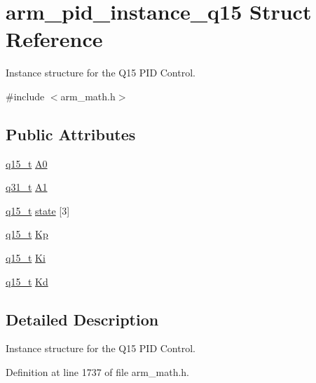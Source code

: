 \hypertarget{structarm__pid__instance__q15}{}\section{arm\+\_\+pid\+\_\+instance\+\_\+q15 Struct Reference}
\label{structarm__pid__instance__q15}


Instance structure for the Q15 P\+ID Control.  




{\ttfamily \#include $<$arm\+\_\+math.\+h$>$}

\subsection*{Public Attributes}
\begin{DoxyCompactItemize}
\item 
\hyperlink{arm__math_8h_ab5a8fb21a5b3b983d5f54f31614052ea}{q15\+\_\+t} \hyperlink{structarm__pid__instance__q15_ad77f3a2823c7f96de42c92a3fbf3246b}{A0}
\item 
\hyperlink{arm__math_8h_adc89a3547f5324b7b3b95adec3806bc0}{q31\+\_\+t} \hyperlink{structarm__pid__instance__q15_a1b8412c517071962a9acfdc6778906ec}{A1}
\item 
\hyperlink{arm__math_8h_ab5a8fb21a5b3b983d5f54f31614052ea}{q15\+\_\+t} \hyperlink{structarm__pid__instance__q15_a4a3f0a878b5b6b055e3478a2f244cd30}{state} \mbox{[}3\mbox{]}
\item 
\hyperlink{arm__math_8h_ab5a8fb21a5b3b983d5f54f31614052ea}{q15\+\_\+t} \hyperlink{structarm__pid__instance__q15_ad228aae24a1b6d855c93a8b9bbc1c4f1}{Kp}
\item 
\hyperlink{arm__math_8h_ab5a8fb21a5b3b983d5f54f31614052ea}{q15\+\_\+t} \hyperlink{structarm__pid__instance__q15_a0dcc19d5c8f7bc401acea9e8318cd777}{Ki}
\item 
\hyperlink{arm__math_8h_ab5a8fb21a5b3b983d5f54f31614052ea}{q15\+\_\+t} \hyperlink{structarm__pid__instance__q15_af5d4b53091f19eff7536636b7cc43111}{Kd}
\end{DoxyCompactItemize}


\subsection{Detailed Description}
Instance structure for the Q15 P\+ID Control. 

Definition at line 1737 of file arm\+\_\+math.\+h.




